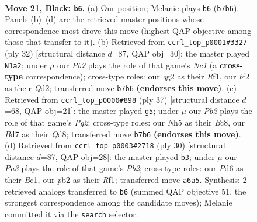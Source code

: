 \documentclass[11pt]{article}
\begin{document}
\clearpage

\begin{figure}[p]\centering
\begin{subfigure}{0.46\textwidth}\centering
\resizebox{\linewidth}{!}{%
\newchessgame
\chessboard[
  setfen={rn5r/1pqb1kbp/p2pp1p1/4p1Pn/4P3/2N2P2/PPPK1BQP/1R2RB2 b - - 3 21},
  showmover=false,
  pgfstyle=straightmove, color=movearrow, markmove={b7-b6}
]}
\caption{}
\end{subfigure}\hfill
\begin{subfigure}{0.46\textwidth}\centering
\resizebox{\linewidth}{!}{%
\newchessgame
\chessboard[
  setfen={1rb2rk1/1pqn2bp/p2p4/3P1pBn/P1p5/2N2P2/1P1QB1PP/R1N2R1K w - - 0 17},
  showmover=false,
  pgfstyle=straightmove, color=movearrow, markmove={c1-a2}
]}
\caption{}
\end{subfigure}
\\[4pt]
\begin{subfigure}{0.46\textwidth}\centering
\resizebox{\linewidth}{!}{%
\newchessgame
\chessboard[
  setfen={2bqnrk1/r5pp/1p1p1b2/p1pP1p2/8/P1N3P1/1PQBPPBP/1R2R1K1 b - - 0 19},
  showmover=false,
  pgfstyle=straightmove, color=movearrow, markmove={g7-g5}
]}
\caption{}
\end{subfigure}\hfill
\begin{subfigure}{0.46\textwidth}\centering
\resizebox{\linewidth}{!}{%
\newchessgame
\chessboard[
  setfen={r1q2rk1/1ppb1pbp/p2p2p1/3P4/2n1P2P/2N3P1/PPQ2PB1/R1B2RK1 w - - 0 16},
  showmover=false,
  pgfstyle=straightmove, color=movearrow, markmove={b2-b3}
]}
\caption{}
\end{subfigure}
\caption{\textbf{Move 21, Black: \texttt{b6}.} (a) Our position; Melanie plays \texttt{b6} (\texttt{b7b6}). Panels (b)--(d) are the retrieved master positions whose correspondence most drove this move (highest QAP objective among those that transfer to it). (b) Retrieved from \texttt{ccrl\_top\_p0001\#3327} (ply 32) [structural distance $d$=87, QAP obj=30]: the master played \texttt{N1a2}; under $\mu$ our \emph{Pb2} plays the role of that game's \emph{Nc1} (a \textbf{cross-type} correspondence); cross-type roles: our \emph{q}g2 as their \emph{R}f1, our \emph{b}f2 as their \emph{Q}d2; transferred move \texttt{b7b6} \textbf{(endorses this move)}. (c) Retrieved from \texttt{ccrl\_top\_p0000\#898} (ply 37) [structural distance $d$=68, QAP obj=21]: the master played \texttt{g5}; under $\mu$ our \emph{Pb2} plays the role of that game's \emph{Pg2}; cross-type roles: our \emph{N}h5 as their \emph{B}c8, our \emph{B}d7 as their \emph{Q}d8; transferred move \texttt{b7b6} \textbf{(endorses this move)}. (d) Retrieved from \texttt{ccrl\_top\_p0003\#2718} (ply 30) [structural distance $d$=87, QAP obj=28]: the master played \texttt{b3}; under $\mu$ our \emph{Pa3} plays the role of that game's \emph{Pb2}; cross-type roles: our \emph{P}d6 as their \emph{B}c1, our \emph{p}b2 as their \emph{R}f1; transferred move \texttt{a6a5}. Synthesis: 2 retrieved analogs transferred to \texttt{b6} (summed QAP objective 51, the strongest correspondence among the candidate moves); Melanie committed it via the \texttt{search} selector.}
\label{fig:thought-m41}
\end{figure}
\end{document}
